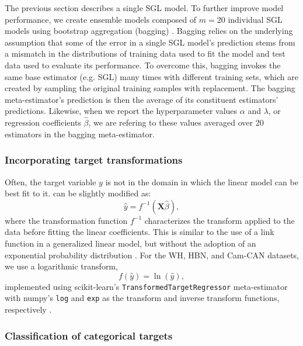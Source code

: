 \documentclass[10pt,letterpaper]{article}
\begin{document}
The previous section describes a single SGL model. To further improve model
performance, we create ensemble models composed of $m = 20$ individual SGL
models using bootstrap aggregation (bagging) \cite{breiman1996bagging}.
Bagging relies on the underlying assumption that some of the error in a
single SGL model's prediction stems from a mismatch in the distributions of
training data used to fit the model and test data used to evaluate its
performance. To overcome this, bagging invokes the same base estimator (e.g.
SGL) many times with different training sets, which are created by sampling
the original training samples with replacement. The bagging meta-estimator's
prediction is then the average of its constituent estimators' predictions.
Likewise, when we report the hyperparameter values $\alpha$ and $\lambda$, or
regression coefficients $\hat{\beta}$, we are refering to these values
averaged over 20 estimators in the bagging meta-estimator.

\subsubsection*{Incorporating target transformations}

Often, the target variable $y$ is not in the domain in which the linear
model can be best fit to it.  can be slightly
modified as:
\begin{equation}
    \hat{y} = f^{-1} \left( \mathbf{X} \hat{\beta} \right),
    \label{eq:lm-transform}
\end{equation}
where the transformation function $f^{-1}$ characterizes the transform
applied to the data before fitting the linear coefficients.
This is similar to the use of a link function in a generalized linear model, but without the adoption of an exponential probability distribution \cite{nelder1972technique}.
For the WH, HBN, and Cam-CAN datasets, we use a
logarithmic transform,
\begin{equation}
    f \left( \hat{y} \right) = \ln \left( \hat{y} \right),
    \label{eq:log-nonlinearity}
\end{equation}
implemented using scikit-learn's \lstinline|TransformedTargetRegressor| meta-estimator \cite{scikit-learn} with numpy's \lstinline|log| and \lstinline|exp| as the transform and inverse transform functions, respectively \cite{harris2020array}.

\subsubsection*{Classification of categorical targets}
\end{document}
